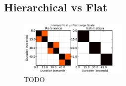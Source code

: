 \documentclass{article}
\begin{document}



\subsection{Hierarchical vs Flat}

\begin{figure}
  \centering
  \includegraphics[width=0.47\textwidth]{plots/hier-flatlarge.pdf}
  \caption{TODO}
  \label{fig:hier-flatlarge}
\end{figure}%
\end{document}

